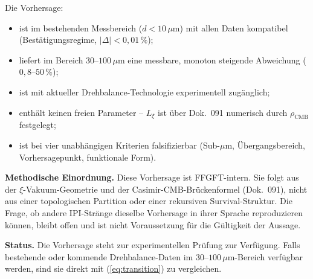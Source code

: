 Die Vorhersage:
\begin{itemize}[leftmargin=2em,itemsep=2pt,topsep=2pt]
  \item ist im bestehenden Messbereich ($d < 10\,\mu$m) mit allen
        Daten kompatibel (Bestätigungsregime, $|\Delta| < 0{,}01\,\%$);
  \item liefert im Bereich $30$--$100\,\mu$m eine messbare,
        monoton steigende Abweichung ($0{,}8$--$50\,\%$);
  \item ist mit aktueller Drehbalance-Technologie experimentell
        zugänglich;
  \item enthält keinen freien Parameter -- $L_\xi$ ist über
        Dok.~091 numerisch durch $\rho_\text{CMB}$ festgelegt;
  \item ist bei vier unabhängigen Kriterien falsifizierbar
        (Sub-$\mu$m, Übergangsbereich, Vorhersagepunkt,
        funktionale Form).
\end{itemize}

\textbf{Methodische Einordnung.} Diese Vorhersage ist
FFGFT-intern. Sie folgt aus der $\xi$-Vakuum-Geometrie und der
Casimir-CMB-Brückenformel (Dok.~091), nicht aus einer
topologischen Partition oder einer rekursiven Survival-Struktur.
Die Frage, ob andere IPI-Stränge dieselbe Vorhersage in ihrer
Sprache reproduzieren können, bleibt offen und ist nicht
Voraussetzung für die Gültigkeit der Aussage.

\textbf{Status.} Die Vorhersage steht zur experimentellen Prüfung
zur Verfügung. Falls bestehende oder kommende Drehbalance-Daten
im $30$--$100\,\mu$m-Bereich verfügbar werden, sind sie direkt
mit (\ref{eq:transition}) zu vergleichen.
